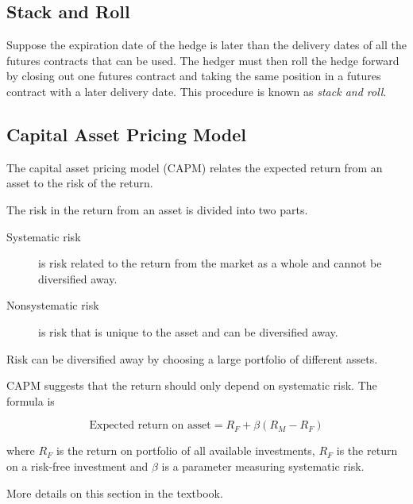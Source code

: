 \subsection{Stack and Roll}

Suppose the expiration date of the hedge is later than the delivery dates of all the futures contracts that can be used. The hedger must then roll the hedge forward by closing out one futures contract and taking the same position in a futures contract with a later delivery date. This procedure is known as \emph{stack and roll}.

\subsection{Capital Asset Pricing Model}

The capital asset pricing model (CAPM) relates the expected return from an asset to the risk of the return.

\begin{definition}
    The risk in the return from an asset is divided into two parts. 
    \begin{description}
        \item[Systematic risk] is risk related to the return from the market as a whole and cannot be diversified away.
        \item[Nonsystematic risk] is risk that is unique to the asset and can be diversified away.
    \end{description}
    \begin{note}
        Risk can be diversified away by choosing a large portfolio of different assets.
    \end{note}
\end{definition}

CAPM suggests that the return should only depend on systematic risk. The formula is

\begin{equation}
    \text{Expected return on asset}=R_{F}+\beta(R_{M}-R_{F})
\end{equation}

where \(R_{F}\) is the return on portfolio of all available investments, \(R_{F}\) is the return on a risk-free investment and \(\beta\) is a parameter measuring systematic risk.

More details on this section in the textbook.